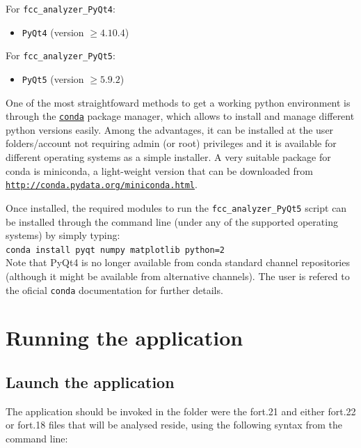 \documentclass[a4paper,11pt]{article}
\begin{document}
For \texttt{fcc\_analyzer\_PyQt4}:

\begin{itemize}
 \item \texttt{PyQt4} (version $\geq4.10.4$)
\end{itemize}

For \texttt{fcc\_analyzer\_PyQt5}:

\begin{itemize}
 \item \texttt{PyQt5} (version $\geq5.9.2$)
\end{itemize}


One of the most straightfoward methods to get a working python environment is through the \href{http://conda.pydata.org/docs/intro.html}{\texttt{conda}} package manager, which allows to install and manage different python versions easily. Among the advantages, it can be installed at the user folders/account not requiring admin (or root) privileges and it is available for different operating systems as a simple installer. A very suitable package for conda is miniconda, a light-weight version that can be downloaded from \href{http://conda.pydata.org/miniconda.html}{\texttt{http://conda.pydata.org/miniconda.html}}.

Once installed, the required modules to run the \texttt{fcc\_analyzer\_PyQt5} script can be installed through the command line (under any of the supported operating systems) by simply typing:\\

\texttt{conda install pyqt numpy matplotlib python=2}\\

Note that PyQt4 is no longer available from conda standard channel repositories 
(although it might be available from alternative channels). 
The user is refered to the oficial \texttt{conda} documentation for further details.


\section{Running the application}

\subsection{Launch the application}
The application should be invoked in the folder were the fort.21 and either fort.22 or fort.18 files that will be analysed reside, using the following syntax from the command line:\\
\end{document}
